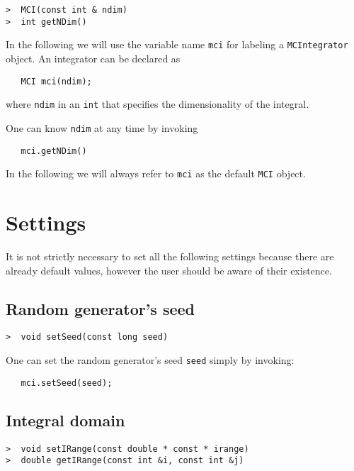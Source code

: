 \documentclass[11pt,a4paper,twoside]{article}
\begin{document}
\begin{verbatim}
>  MCI(const int & ndim)
>  int getNDim()
\end{verbatim}

In the following we will use the variable name \verb+mci+ for labeling a \verb+MCIntegrator+ object.
An integrator can be declared as
\begin{verbatim}
   MCI mci(ndim);
\end{verbatim}
where \verb+ndim+ in an \verb+int+ that specifies the dimensionality of the integral.

One can know \verb+ndim+ at any time by invoking
\begin{verbatim}
   mci.getNDim()
\end{verbatim}

In the following we will always refer to \verb+mci+ as the default \verb+MCI+ object.


\section{Settings}
It is not strictly necessary to set all the following settings because there are already default values, however the user should be aware of their existence.



\subsection{Random generator's seed} %
\label{sub:random_generator_seed}

\begin{verbatim}
>  void setSeed(const long seed)
\end{verbatim}

One can set the random generator's seed \verb+seed+ simply by invoking:
\begin{verbatim}
   mci.setSeed(seed);
\end{verbatim}



\subsection{Integral domain} %
\label{sub:integral_domain}

\begin{verbatim}
>  void setIRange(const double * const * irange)
>  double getIRange(const int &i, const int &j)
\end{verbatim}
\end{document}
